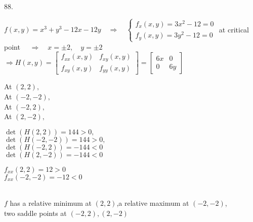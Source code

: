 \documentclass[12pt]{book}
\begin{document}
\begin{CJK}{UTF8}{bsmi}
88. \begin{minipage}[t]{\dimexpr\linewidth-2em}
$f(x, y)=x^3+y^3-12x-12y\quad\Rightarrow\quad\left\{\begin{matrix}
f_x(x, y) = 3x^2-12 = 0 \\
f_y(x, y) = 3y^2-12 = 0
\end{matrix}\right.$ at critical point $\quad\Rightarrow\quad x=\pm2,\quad y=\pm2$\\
$\Rightarrow H(x,y)=\begin{bmatrix}
f_{xx}(x, y) & f_{xy}(x, y) \\
f_{xy}(x, y) & f_{yy}(x, y)
\end{bmatrix}=\begin{bmatrix}
6x & 0  \\
0 & 6y
\end{bmatrix}$ \\
\begin{minipage}[t]{6.5em}
At $( 2, 2),\quad$ \\
At $(-2,-2),\quad$ \\
At $(-2, 2),\quad$ \\
At $( 2,-2),\quad$
\end{minipage}
\begin{minipage}[t]{13em}
$\det(H( 2, 2))= 144>0,\quad$ \\
$\det(H(-2,-2))= 144>0,\quad$ \\
$\det(H(-2, 2))=-144<0$ \\
$\det(H( 2,-2))=-144<0$
\end{minipage}
\begin{minipage}[t]{15em}
$f_{xx}( 2, 2)= 12>0$ \\
$f_{xx}(-2,-2)=-12<0$ \\
\end{minipage} \\
$f$ has a relative minimum at $(2, 2)$,\quad a relative maximum at $(-2, -2)$,\\ two saddle points at $(-2, 2), (2, -2)$
\end{minipage}\\

\end{CJK}
\end{document}
